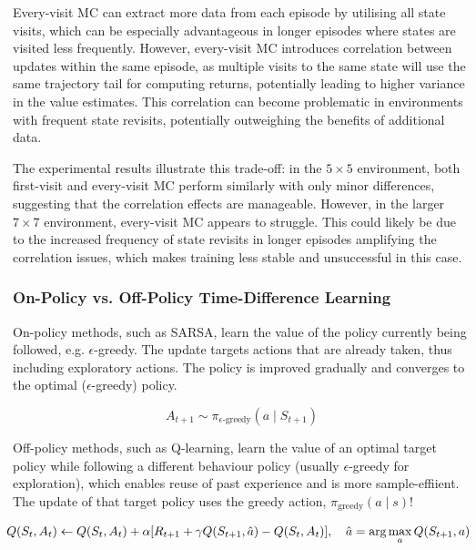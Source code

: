 \documentclass[12pt]{article}
\begin{document}
Every-visit MC can extract more data from each episode by utilising all state visits, which can be especially advantageous in longer episodes where states are visited less frequently.
However, every-visit MC introduces correlation between updates within the same episode, as multiple visits to the same state will use the same trajectory tail for computing returns, potentially leading to higher variance in the value estimates.
This correlation can become problematic in environments with frequent state revisits, potentially outweighing the benefits of additional data.

The experimental results illustrate this trade-off: in the $5 \times 5$ environment, both first-visit and every-visit MC perform similarly with only minor differences, suggesting that the correlation effects are manageable.
However, in the larger $7 \times 7$ environment, every-visit MC appears to struggle. This could likely be due to the increased frequency of state revisits in longer episodes amplifying the correlation issues, which makes training less stable and unsuccessful in this case.


\subsubsection{On-Policy vs. Off-Policy Time-Difference Learning}

On-policy methods, such as SARSA, learn the value of the policy currently being followed, e.g. $\epsilon$-greedy.
The update targets actions that are already taken, thus including exploratory actions.
The policy is improved gradually and converges to the optimal ($\epsilon$-greedy) policy.

\begin{equation}
	A_{t+1} \sim \pi_{\epsilon\text{-greedy}}(a \mid S_{t+1})
\end{equation}

Off-policy methods, such as Q-learning, learn the value of an optimal target policy
while following a different behaviour policy (usually $\epsilon$-greedy for exploration), which enables reuse of past experience and is more sample-effiient.
The update of that target policy uses the greedy action, $\pi_\text{greedy}(a \mid s)$!

\begin{equation}
	\hspace{-5pt}
	Q(S_t,A_t) \leftarrow Q(S_t,A_t) + \alpha [ R_{t+1} + \gamma Q(S_{t+1}, \hat{a}) - Q(S_t,A_t) ]
	, \quad
	\hat{a} = \arg\max_{a} Q(S_{t+1}, a)
\end{equation}
\end{document}
